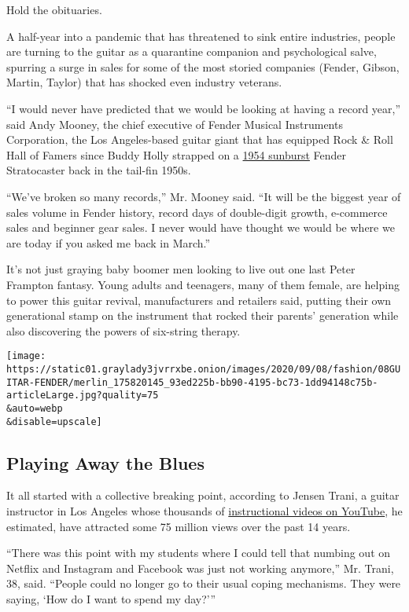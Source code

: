 Hold the obituaries.

A half-year into a pandemic that has threatened to sink entire
industries, people are turning to the guitar as a quarantine companion
and psychological salve, spurring a surge in sales for some of the most
storied companies (Fender, Gibson, Martin, Taylor) that has shocked even
industry veterans.

``I would never have predicted that we would be looking at having a
record year,'' said Andy Mooney, the chief executive of Fender Musical
Instruments Corporation, the Los Angeles-based guitar giant that has
equipped Rock \& Roll Hall of Famers since Buddy Holly strapped on a
\href{https://guitar.com/news/watch-new-documentary-unearths-what-could-be-buddy-hollys-long-lost-strat/}{1954
sunburst} Fender Stratocaster back in the tail-fin 1950s.

``We've broken so many records,'' Mr. Mooney said. ``It will be the
biggest year of sales volume in Fender history, record days of
double-digit growth, e-commerce sales and beginner gear sales. I never
would have thought we would be where we are today if you asked me back
in March.''

It's not just graying baby boomer men looking to live out one last Peter
Frampton fantasy. Young adults and teenagers, many of them female, are
helping to power this guitar revival, manufacturers and retailers said,
putting their own generational stamp on the instrument that rocked their
parents' generation while also discovering the powers of six-string
therapy.

\texttt{[image: https://static01.graylady3jvrrxbe.onion/images/2020/09/08/fashion/08GUITAR-FENDER/merlin\_175820145\_93ed225b-bb90-4195-bc73-1dd94148c75b-articleLarge.jpg?quality=75\\\&auto=webp\\\&disable=upscale]}

\hypertarget{playing-away-the-blues}{%
\subsection{Playing Away the Blues}\label{playing-away-the-blues}}

It all started with a collective breaking point, according to Jensen
Trani, a guitar instructor in Los Angeles whose thousands of
\href{https://www.youtube.com/channel/UCkD5j0H8JRsVaegeQdkVUaA}{instructional
videos on YouTube}, he estimated, have attracted some 75 million views
over the past 14 years.

``There was this point with my students where I could tell that numbing
out on Netflix and Instagram and Facebook was just not working
anymore,'' Mr. Trani, 38, said. ``People could no longer go to their
usual coping mechanisms. They were saying, `How do I want to spend my
day?'''

